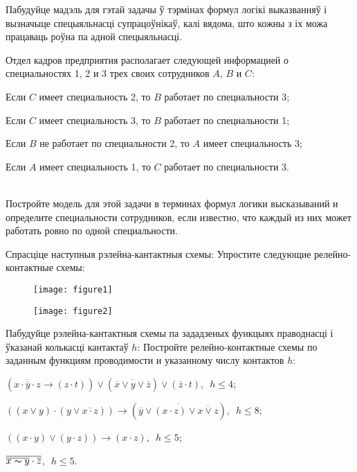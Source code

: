 \begin{problemList}
{Пабудуйце мадэль для гэтай задачы ў тэрмінах формул логікі выказванняў і вызначыце спецыяльнасці супрацоўнікаў, калі вядома, што кожны з іх можа працаваць роўна па адной спецыяльнасці.}
{Отдел кадров предприятия располагает следующей информацией о специальностях 1, 2 и 3 трех своих сотрудников $A$, $B$ и $C$:
\begin{russianEnumerate}
	\item Если $C$ имеет специальность 2, то $B$ работает по специальности 3;
	\item Если $C$ имеет специальность 3, то $B$ работает по специальности 1;
	\item Если $B$ не работает по специальности 2, то $A$ имеет специальность 3;
	\item Если $A$ имеет специальность 1, то $C$ работает по специальности 3.
\end{russianEnumerate}\\
Постройте модель для этой задачи в терминах формул логики высказываний и определите  специальности сотрудников, если известно, что каждый из них может работать ровно по  одной специальности.}

\bigskip

\problemItemWithCommonPart
{Спрасціце наступныя рэлейна-кантактныя схемы:}
{Упростите следующие релейно-контактные схемы:}
{%
\begin{figure}[H]
	\begin{center}
		\texttt{[image: figure1]}
	\end{center}
\end{figure}

\begin{figure}[H]
	\begin{center}
		\texttt{[image: figure2]}
	\end{center}
\end{figure}
}

\problemItemWithCommonPart
{Пабудуйце рэлейна-кантактныя схемы па зададзеных функцыях праводнасці і ўказанай колькасці кантактаў $h$:}
{Постройте релейно-контактные схемы по заданным функциям проводимости и указанному числу контактов $h$:}
{%
\begin{belarusianEnumerate}
	\item $(\overline{x \cdot \overline{y} \cdot z} \to (z \cdot t)) \vee
	(\overline{\overline{x} \vee y \vee \overline{z}}) \vee (\overline{z} \cdot t)$,\,\, $h \le 4$;
	\item $((x \vee y) \cdot (y \vee \overline{x \cdot z})) \to (\overline{\overline{y} \vee
	(x \cdot z) \vee \overline{x \vee z}})$,\,\, $h \le 8$;
	\item $((x \cdot y) \vee (y \cdot z)) \to (x \cdot z)$,\,\, $h \le 5$;
	\item $\overline{\overline{x \thicksim y} \cdot \overline{z}}$,\,\, $h \le 5$.
\end{belarusianEnumerate}
}


\end{problemList}
